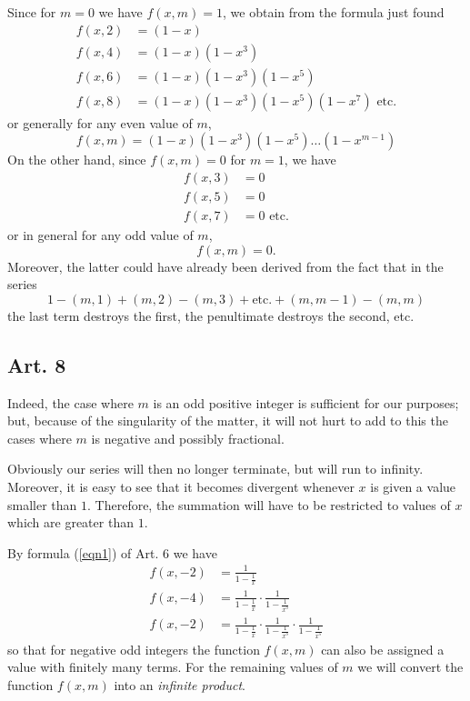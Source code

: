 \documentclass{book}
\theoremstyle{plain}
\theoremstyle{remark}
\begin{document}
Since for $m=0$ we have $f(x,m) =1$, we obtain from the formula just found
\begin{align*} 
f(x,2) &= (1-x) \\
f(x,4) &= (1-x)(1-x^3) \\
f(x,6) &= (1-x)(1-x^3)(1-x^5) \\
f(x,8) &= (1-x)(1-x^3)(1-x^5)(1-x^7) \textrm{ etc.} 
\end{align*} 
or generally for any even value of $m$,
\begin{equation} f(x,m) = (1-x)(1-x^3)(1-x^5)\dots(1-x^{m-1}) \label{eqn2} \end{equation}
On the other hand, since $f(x,m) =0$ for $m=1$, we have 
\begin{align*}
 f(x,3) &= 0 \\
 f(x,5) &= 0 \\
 f(x,7) &= 0 \textrm{ etc.}
 \end{align*}
 or in general for any odd value of $m$,
 \[ f(x,m) = 0. \]
 Moreover, the latter could have already been derived from the fact that in the series
 \[ 1 - (m,1) + (m,2) - (m,3) + \textrm{etc.} + (m,m-1)-(m,m) \]
 the last term destroys the first, the penultimate destroys the second, etc.
 
 \subsection*{Art. 8} 
 
 Indeed, the case where $m$ is an odd positive integer is sufficient for our purposes; but, because of the singularity of the matter, it will not hurt to add to this the cases where $m$ is  negative and possibly fractional. 
 
 Obviously our series will then no longer terminate, but will run to infinity.  Moreover, it is easy to see that it becomes divergent whenever $x$ is given a value smaller than $1$.  Therefore, the summation will have to be restricted to values of $x$ which are greater than $1$. 
 
 By formula  (\ref{eqn1}) of Art. 6 we have
 \begin{align*} 
 f(x,-2) &= \frac{1}{1-\frac{1}{x}} \\
 f(x,-4) &= \frac{1}{1-\frac{1}{x}} \cdot \frac{1}{1-\frac{1}{x^3}} \\
 f(x,-2) &= \frac{1}{1-\frac{1}{x}}  \cdot \frac{1}{1-\frac{1}{x^3}} \cdot \frac{1}{1-\frac{1}{x^5}} 
 \end{align*}
 so that for negative odd integers the function $f(x,m)$ can also be assigned a value with finitely many terms.  For the remaining values of $m$ we will convert the function $f(x,m)$ into an \emph{infinite product}.  
 
\end{document}
